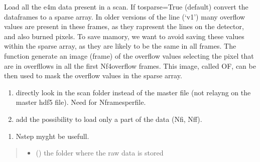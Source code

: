 \documentclass[letterpaper,10pt,english]{sphinxmanual}
\begin{document}
\begin{fulllineitems}
\label{\detokenize{index:ID10_tools.load_dense_e4m}}
\pysigstartsignatures
\pysiglinewithargsret
{}
{\sphinxparamcomma {}\sphinxparamcomma {}\sphinxparamcomma {}\sphinxparamcomma {}\sphinxparamcomma {}\sphinxparamcomma {}\sphinxparamcomma {}}
{}
\pysigstopsignatures
\sphinxAtStartPar
Load all the e4m data present in a scan.
If tosparse=True (default) convert the dataframes to a sparse array.
In older versions of the line (‘v1’) many overflow values are present in these frames, as they rapresent the lines on the detector, and also burned pixels.
To save mamory, we want to avoid saving these values within the sparse array, as they are likely to be the same in all frames.
The function generate an image (frame) of the overflow values selecting the pixel that are in overfllows in all the first Nf4overflow frames.
This image, called OF, can be then used to mask the overflow values in the sparse array.
\begin{description}
\begin{enumerate}
%
\item {} 
\sphinxAtStartPar
directly look in the scan folder instead of the master file (not relayng on the master hdf5 file). Need for Nframesperfile.

\item {} 
\sphinxAtStartPar
add the possibility to load only a part of the data (Nfi, Nff).

\end{enumerate}

\begin{enumerate}
%
\item {} 
\sphinxAtStartPar
Nstep myght be usefull.

\end{enumerate}

\end{description}
\begin{quote}\begin{description}
\begin{itemize}
\item {} 
\sphinxAtStartPar
{} () \textendash{} the folder where the raw data is stored


\end{itemize}
\end{description}
\end{quote}
\end{fulllineitems}
\end{document}
